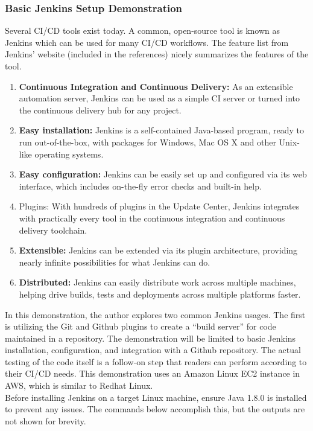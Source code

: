 \subsubsection{Basic Jenkins Setup Demonstration}
Several CI/CD tools exist today. A common, open-source tool is known as
Jenkins which can be used for many CI/CD workflows. The feature list from
Jenkins’ website (included in the references) nicely summarizes the features
of the tool.

\begin{enumerate}
  \item \textbf{Continuous Integration and Continuous Delivery:} As an
  extensible automation server, Jenkins can be used as a simple CI server or
  turned into the continuous delivery hub for any project.
  \item \textbf{Easy installation:} Jenkins is a self-contained Java-based
  program, ready to run out-of-the-box, with packages for Windows, Mac OS X
  and other Unix-like operating systems.
  \item \textbf{Easy configuration:} Jenkins can be easily set up and
  configured via its web interface, which includes on-the-fly error checks and
  built-in help.  \item Plugins: With hundreds of plugins in the Update
  Center, Jenkins integrates with practically every tool in the continuous
  integration and continuous delivery toolchain.
  \item \textbf{Extensible:} Jenkins can be extended via its plugin
  architecture, providing nearly infinite possibilities for what Jenkins can do.
  \item \textbf{Distributed:} Jenkins can easily distribute work across
  multiple machines, helping drive builds, tests and deployments across
  multiple platforms faster.
\end{enumerate}

In this demonstration, the author explores two common Jenkins usages. The
first is utilizing the Git and Github plugins to create a ``build server'' for
code maintained in a repository. The demonstration will be limited to basic
Jenkins installation, configuration, and integration with a Github repository.
The actual testing of the code itself is a follow-on step that readers can
perform according to their CI/CD needs. This demonstration uses an Amazon
Linux EC2 instance in AWS, which is similar to Redhat Linux. \\

Before installing Jenkins on a target Linux machine, ensure Java 1.8.0 is
installed to prevent any issues. The commands below accomplish this, but the
outputs are not shown for brevity.

